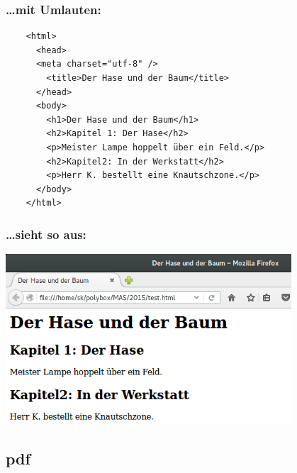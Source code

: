 \begin{frame}[fragile]
\frametitle{\ldots mit Umlauten:}
  \begin{lstlisting}
    <html>
      <head>
      <meta charset="utf-8" />
        <title>Der Hase und der Baum</title>
      </head>
      <body>
        <h1>Der Hase und der Baum</h1>
        <h2>Kapitel 1: Der Hase</h2>
        <p>Meister Lampe hoppelt über ein Feld.</p>
        <h2>Kapitel2: In der Werkstatt</h2>
        <p>Herr K. bestellt eine Knautschzone.</p>
      </body>
    </html>
  \end{lstlisting}
\end{frame}
%
\begin{frame}
\frametitle{\ldots sieht so aus:}
  \begin{center}
    \includegraphics[width=0.8\textwidth]{pics/testseite-utf8.png}
  \end{center}
\end{frame}
%
\subsection{pdf}

